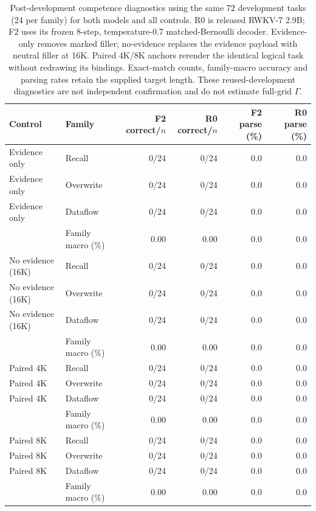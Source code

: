 \begin{table}[t]
\centering
\small
\begin{tabular}{llrrrr}
\toprule
Control & Family & F2 correct/$n$ & R0 correct/$n$ & F2 parse (\%) & R0 parse (\%) \\
\midrule
Evidence only & Recall & 0/24 & 0/24 & 0.0 & 0.0 \\
Evidence only & Overwrite & 0/24 & 0/24 & 0.0 & 0.0 \\
Evidence only & Dataflow & 0/24 & 0/24 & 0.0 & 0.0 \\
 & Family macro (\%) & 0.00 & 0.00 & 0.0 & 0.0 \\
\midrule
No evidence (16K) & Recall & 0/24 & 0/24 & 0.0 & 0.0 \\
No evidence (16K) & Overwrite & 0/24 & 0/24 & 0.0 & 0.0 \\
No evidence (16K) & Dataflow & 0/24 & 0/24 & 0.0 & 0.0 \\
 & Family macro (\%) & 0.00 & 0.00 & 0.0 & 0.0 \\
\midrule
Paired 4K & Recall & 0/24 & 0/24 & 0.0 & 0.0 \\
Paired 4K & Overwrite & 0/24 & 0/24 & 0.0 & 0.0 \\
Paired 4K & Dataflow & 0/24 & 0/24 & 0.0 & 0.0 \\
 & Family macro (\%) & 0.00 & 0.00 & 0.0 & 0.0 \\
\midrule
Paired 8K & Recall & 0/24 & 0/24 & 0.0 & 0.0 \\
Paired 8K & Overwrite & 0/24 & 0/24 & 0.0 & 0.0 \\
Paired 8K & Dataflow & 0/24 & 0/24 & 0.0 & 0.0 \\
 & Family macro (\%) & 0.00 & 0.00 & 0.0 & 0.0 \\
\bottomrule
\end{tabular}
\caption{Post-development competence diagnostics using the same 72 development tasks (24 per family) for both models and all controls. R0 is released RWKV-7 2.9B; F2 uses its frozen 8-step, temperature-0.7 matched-Bernoulli decoder. Evidence-only removes marked filler; no-evidence replaces the evidence payload with neutral filler at 16K. Paired 4K/8K anchors rerender the identical logical task without redrawing its bindings. Exact-match counts, family-macro accuracy and parsing rates retain the supplied target length. These reused-development diagnostics are not independent confirmation and do not estimate full-grid $\Gamma$.}
\label{tab:e3-controls}
\end{table}
